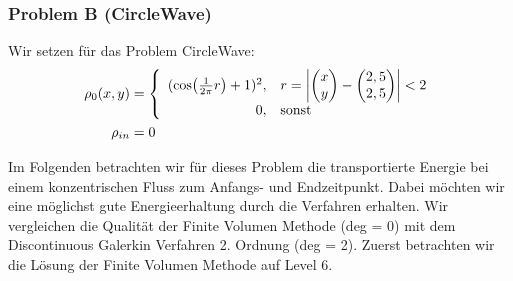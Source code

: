 \subsubsection{Problem B (CircleWave)}
Wir setzen für das Problem CircleWave:
\begin{align*}
  \rho_0(x,y) &= 
  \left\{ 
    \begin{array}{r l}
      (\cos(\frac{1}{2 \pi}r)+1)^2,& 
      r = \left| 
      \begin{pmatrix}
        x \\ y \end{pmatrix} 
      - 
      \begin{pmatrix}
        2,5 \\ 2,5 \end{pmatrix} \right| < 2  
      \\
      0 ,& \text{sonst}
    \end{array}      
  \right. 
  \\
  \rho_{in} &= 0
\end{align*}

Im Folgenden betrachten wir für dieses Problem die transportierte Energie bei einem konzentrischen Fluss zum Anfangs- und Endzeitpunkt. Dabei möchten wir eine möglichst gute Energieerhaltung durch die Verfahren erhalten. Wir vergleichen die Qualität der Finite Volumen Methode (deg = 0) mit dem Discontinuous Galerkin Verfahren 2. Ordnung (deg = 2). Zuerst betrachten wir die Lösung der Finite 
Volumen Methode auf Level 6.
\begin{figure}[H]
	\centering
\end{figure}

